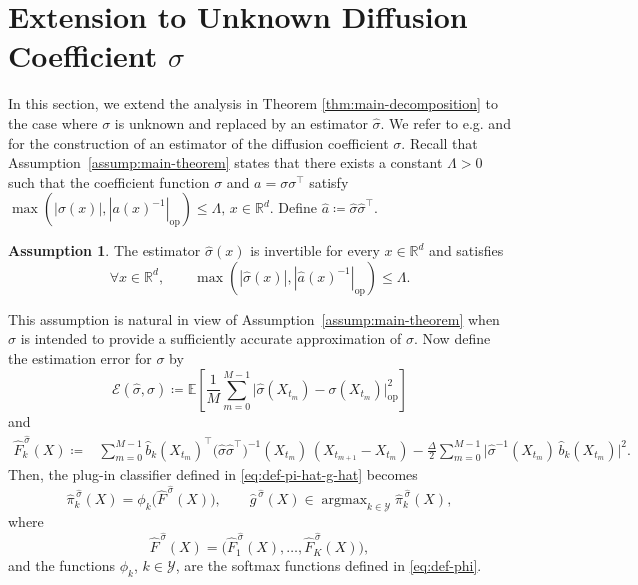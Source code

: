 \documentclass{article}
\theoremstyle{plain}
\theoremstyle{definition}
\newtheorem{assumption}[theorem]{Assumption}
\theoremstyle{remark}
\newcommand{\RD}{\mathbb{R}^{d}}
\newcommand{\EE}{\mathbb{E}}
\DeclareMathOperator*{\argmax}{argmax}
\begin{document}
\section{Extension to Unknown Diffusion Coefficient $\sigma$}\label{app:sigma-unknown}

In this section, we extend the analysis in Theorem \ref{thm:main-decomposition} to the case where $\sigma$ is unknown and replaced by an estimator $\widehat{\sigma}$. We refer to e.g. \citet{Comte2007, Comte2010, Florens-Zmirou1993} and \citet{MR3052408, MR1693608} for the construction of an estimator of the diffusion coefficient $\sigma$. Recall that Assumption~\ref{assump:main-theorem} states that there exists a constant $\Lambda > 0$ such that the coefficient function $\sigma$ and 
$
a=\sigma\sigma^{\top}
$ satisfy $\max(|\sigma(x)|,|a(x)^{-1}|_{\mathrm{op}}) \leq \Lambda, \,x\in\RD$. 
Define
$
\widehat{a}\coloneqq \widehat{\sigma}\widehat{\sigma}^{\top}.
$
\begin{assumption}\label{assump:sigma-hat}
The estimator $\widehat\sigma(x)$ is invertible for every $x\in\RD$ and satisfies
\[
\forall x\in\RD,\qquad \max(|\widehat\sigma(x)|, |\widehat{a}(x)^{-1}|_{\mathrm{op}}) \le \Lambda.
\]
\end{assumption}
This assumption is natural in view of Assumption~\ref{assump:main-theorem} when \(\widehat\sigma\) is intended to provide a sufficiently accurate approximation of \(\sigma\). Now define the estimation error for $\sigma$ by
\begin{equation}\label{eq:def-estimation-error-sigma}
\mathcal{E}(\widehat \sigma, \sigma)
\coloneqq
\EE \!\left[
\frac{1}{M}\sum_{m=0}^{M-1}
\Big|\widehat \sigma(X_{t_m})-\sigma(X_{t_m})\Big|_{\mathrm{op}}^2
\right]
\end{equation}
and 
\begin{align}\label{eq:F-hat-new}
\widehat{F}^{\,\widehat{\sigma}}_k(X)
\coloneqq
&\sum_{m=0}^{M-1} \widehat{b}_k(X_{t_m})^{\top} \big(\widehat{\sigma}\widehat{\sigma}^{\top}\big)^{-1}(X_{t_m})\,(X_{t_{m+1}}-X_{t_m})
-\frac{\Delta}{2}\sum_{m=0}^{M-1} \big\lvert \widehat{\sigma}^{-1}(X_{t_m})\,\widehat{b}_k(X_{t_m}) \big\rvert^2.
\end{align}
Then, the plug-in classifier defined in \eqref{eq:def-pi-hat-g-hat} becomes
\begin{equation}\label{eq:def-pi-hat-g-hat-with-F-new}
\widehat\pi^{\,\widehat{\sigma}}_k(X) = \phi_k\big( \widehat{F}^{\,\widehat{\sigma}}(X) \big),
\qquad
\widehat g^{\,\widehat{\sigma}}(X)\in\argmax_{k\in\mathcal{Y}} \widehat \pi^{\,\widehat{\sigma}}_k(X),
\end{equation}
where
\[
\widehat{F}^{\,\widehat{\sigma}}(X)=\big(\widehat{F}^{\,\widehat{\sigma}}_1(X),\dots,\widehat{F}^{\,\widehat{\sigma}}_K(X)\big),
\]
and  the functions $\phi_k$, $k\in\mathcal{Y}$, are the softmax functions defined in \eqref{eq:def-phi}.
\end{document}
